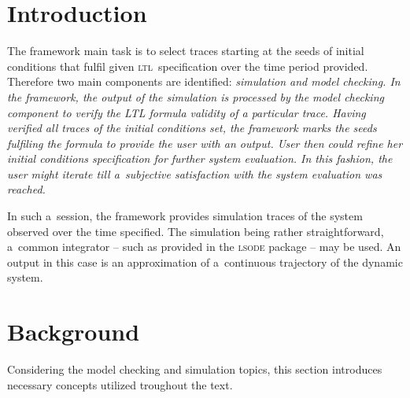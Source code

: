 \documentclass[12pt,oneside,draft]{fithesis}
\newcommand{\ltl}{\textsc{ltl}~}
\begin{document}
\FrontMatter
\ThesisTitlePage

\begin{ThesisDeclaration}
\DeclarationText
\AdvisorName
\end{ThesisDeclaration}




\MainMatter
\tableofcontents
\chapter{Introduction}
The framework main task is to select traces starting at the seeds of
initial conditions that fulfil given \ltl specification over the time
period provided. Therefore two main components are identified:
\em simulation and model checking\rm{}.
In the framework, the output of the simulation is processed by the
model checking component to verify the LTL formula validity of
a particular trace. Having verified all traces of the initial conditions
set, the framework marks the seeds fulfiling the formula to provide
the user with an output. User then could refine her initial conditions
specification for further system evaluation. In this fashion, the user
might iterate till a~subjective satisfaction with the system evaluation
was reached.

In such a~session, the framework provides simulation traces of the
system observed over the time specified. The simulation being rather
straightforward, a~common integrator -- such as provided in the
\textsc{lsode} \cite{lsode} package -- may be used.
An output in this case is an approximation of a~continuous trajectory
of the dynamic system.

\chapter{Background}
Considering the model checking and simulation topics, this section
introduces necessary concepts utilized troughout the text.
\end{document}
